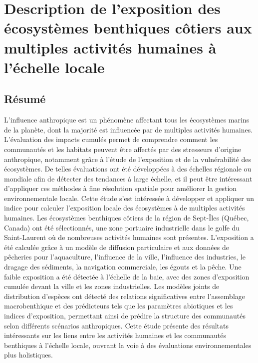 \chapter{Description de l'exposition des écosystèmes benthiques côtiers aux multiples activités humaines à l'échelle locale}
\label{chap3}

\section{Résumé}
L'influence anthropique est un phénomène affectant tous les écosystèmes marins de la planète, dont la majorité est influencée par de multiples activités humaines. L'évaluation des impacts cumulés permet de comprendre comment les communautés et les habitats peuvent être affectés par des stresseurs d'origine anthropique, notamment grâce à l'étude de l'exposition et de la vulnérabilité des écosystèmes. De telles évaluations ont été développées à des échelles régionale ou mondiale afin de détecter des tendances à large échelle, et il peut être intéressant d'appliquer ces méthodes à fine résolution spatiale pour améliorer la gestion environnementale locale. Cette étude s'est intéressée à développer et appliquer un indice pour calculer l'exposition locale des écosystèmes à de multiples activités humaines. Les écosystèmes benthiques côtiers de la région de Sept-Îles (Québec, Canada) ont été sélectionnés, une zone portuaire industrielle dans le golfe du Saint-Laurent où de nombreuses activités humaines sont présentes. L'exposition a été calculée grâce à un modèle de diffusion particulaire et aux données de pêcheries pour l'aquaculture, l'influence de la ville, l'influence des industries, le dragage des sédiments, la navigation commerciale, les égouts et la pêche. Une faible exposition a été détectée à l'échelle de la baie, avec des zones d'exposition cumulée devant la ville et les zones industrielles. Les modèles joints de distribution d'espèces ont détecté des relations significatives entre l'assemblage macrobenthique et des prédicteurs tels que les paramètres abiotiques et les indices d'exposition, permettant ainsi de prédire la structure des communautés selon différents scénarios anthropiques. Cette étude présente des résultats intéressants sur les liens entre les activités humaines et les communautés benthiques à l'échelle locale, ouvrant la voie à des évaluations environnementales plus holistiques. \linebreak[4]

